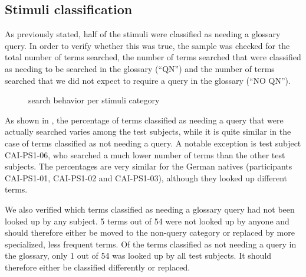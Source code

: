 \documentclass[output=paper]{langsci/langscibook}
\begin{document}
\subsection{Stimuli classification}\label{sec:prandi:5.1}
As previously stated, half of the stimuli were classified as needing a glossary query. In order to verify whether this was true, the sample was checked for the total number of terms searched, the number of terms searched that were classified as needing to be searched in the glossary (``QN'') and the number of terms searched that we did not expect to require a query in the glossary (``NO QN''). 

\begin{figure}
\caption{search behavior per stimuli category}
\label{fig:prandi:9}
\end{figure}

As shown in , the percentage of terms classified as needing a query that were actually searched varies among the test subjects, while it is quite similar in the case of terms classified as not needing a query. A notable exception is test subject \textsc{CAI}-PS1-06, who searched a much lower number of terms than the other test subjects. The percentages are very similar for the German natives (participants \textsc{CAI}-PS1-01, \textsc{CAI}-PS1-02 and \textsc{CAI}-PS1-03), although they looked up different terms.

We also verified which terms classified as needing a glossary query had not been looked up by any subject. 5 terms out of 54 were not looked up by anyone and should therefore either be moved to the non-query category or replaced by more specialized, less frequent terms. Of the terms classified as not needing a query in the glossary, only 1 out of 54 was looked up by all test subjects. It should therefore either be classified differently or replaced. 
\end{document}
